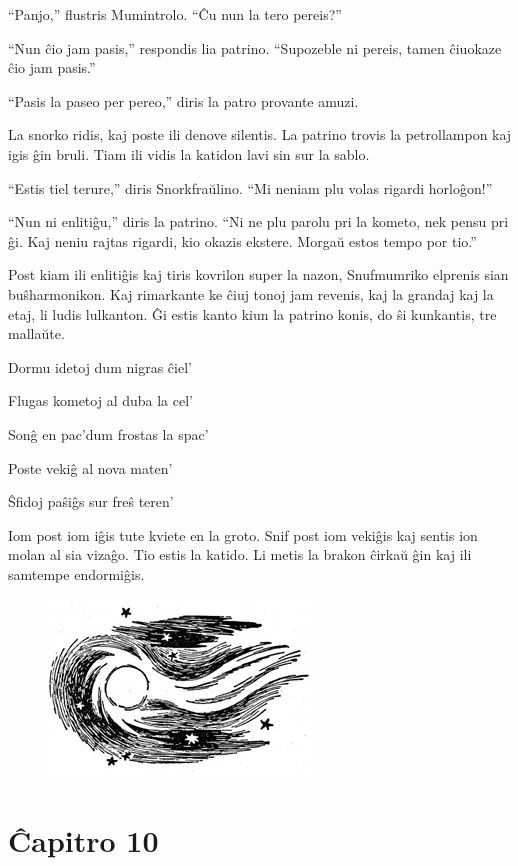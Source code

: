 ``Panjo,'' flustris Mumintrolo. ``Ĉu nun la tero pereis?''

``Nun ĉio jam pasis,'' respondis lia patrino. ``Supozeble ni pereis, tamen ĉiuokaze ĉio jam pasis.''

``Pasis la paseo per pereo,'' diris la patro provante amuzi.

La snorko ridis, kaj poste ili denove silentis. La patrino trovis la petrollampon kaj igis ĝin bruli. Tiam ili vidis la katidon lavi sin sur la sablo.

``Estis tiel terure,'' diris Snorkfraŭlino. ``Mi neniam plu volas rigardi horloĝon!''

``Nun ni enlitiĝu,'' diris la patrino. ``Ni ne plu parolu pri la kometo, nek pensu pri ĝi. Kaj neniu rajtas rigardi, kio okazis ekstere. Morgaŭ estos tempo por tio.''

Post kiam ili enlitiĝis kaj tiris kovrilon super la nazon, Snufmumriko elprenis sian buŝharmonikon. Kaj rimarkante ke ĉiuj tonoj jam revenis, kaj la grandaj kaj la etaj, li ludis lulkanton. Ĝi estis kanto kiun la patrino konis, do ŝi kunkantis, tre mallaŭte.

Dormu idetoj dum nigras ĉiel'

Flugas kometoj al duba la cel'

Sonĝ en pac'dum frostas la spac'

Poste vekiĝ al nova maten'

Ŝfidoj paŝiĝs sur freŝ teren'

Iom post iom iĝis tute kviete en la groto. Snif post iom vekiĝis kaj sentis ion molan al sia vizaĝo. Tio estis la katido. Li metis la brakon ĉirkaŭ ĝin kaj ili samtempe endormiĝis.

\begin{figure}[htbp]
\centering
\includegraphics[width=198pt,height=134pt]{9-13.png}
\caption{}
\label{9-13}
\end{figure}

\chapter*[Ĉapitro 10]{Ĉapitro 10}


